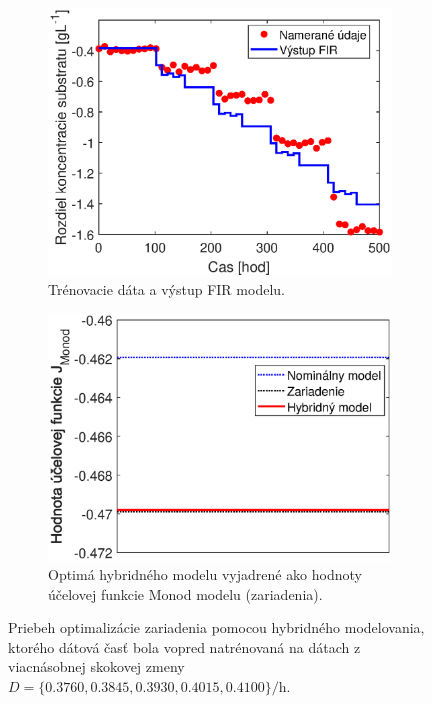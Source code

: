 \begin{figure}
	\centering
	\begin{subfigure}[b]{0.49\textwidth}
		\centering
		\includegraphics[width=\linewidth]{images/hybrid_multipleStep_data}
		\caption{Trénovacie dáta a výstup FIR modelu.\newline \newline}
		\label{fig:hybrid_multipleStep_data}
	\end{subfigure}
	\hfill
	\begin{subfigure}[b]{0.49\textwidth}
		\centering
		\includegraphics[width=\linewidth]{images/hybrid_multipleStep_costFun}
		\caption{Optimá hybridného modelu vyjadrené ako hodnoty účelovej funkcie Monod modelu (zariadenia).}
		\label{fig:hybrid_multipleStep_costFun}
	\end{subfigure}
	\caption{Priebeh optimalizácie zariadenia pomocou hybridného modelovania, ktorého dátová časť bola vopred natrénovaná na dátach z viacnásobnej skokovej zmeny $ D = \lbrace 0.3760, 0.3845, 0.3930, 0.4015, 0.4100 \rbrace \si{\per\hour} $.}
	\label{fig:hybrid_multipleStep_approach}
\end{figure}

